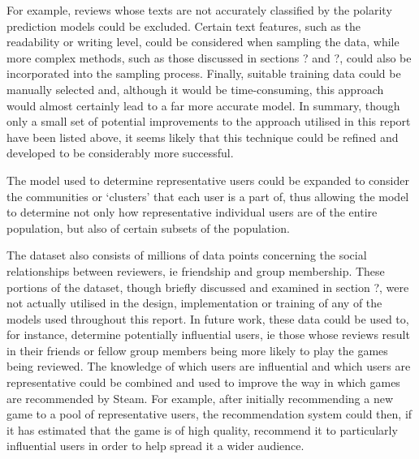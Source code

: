 For example, reviews whose texts are not accurately classified by the polarity prediction models could be excluded. Certain text features, such as the readability or writing level, could be considered when sampling the data, while more complex methods, such as those discussed in sections ? and ?, could also be incorporated into the sampling process. Finally, suitable training data could be manually selected and, although it would be time-consuming, this approach would almost certainly lead to a far more accurate model. In summary, though only a small set of potential improvements to the approach utilised in this report have been listed above, it seems likely that this technique could be refined and developed to be considerably more successful.

The model used to determine representative users could be expanded to consider the communities or `clusters' that each user is a part of, thus allowing the model to determine not only how representative individual users are of the entire population, but also of certain subsets of the population.

The dataset also consists of millions of data points concerning the social relationships between reviewers, ie friendship and group membership. These portions of the dataset, though briefly discussed and examined in section ?, were not actually utilised in the design, implementation or training of any of the models used throughout this report. In future work, these data could be used to, for instance, determine potentially influential users, ie those whose reviews result in their friends or fellow group members being more likely to play the games being reviewed. The knowledge of which users are influential and which users are representative could be combined and used to improve the way in which games are recommended by Steam. For example, after initially recommending a new game to a pool of representative users, the recommendation system could then, if it has estimated that the game is of high quality, recommend it to particularly influential users in order to help spread it a wider audience.
